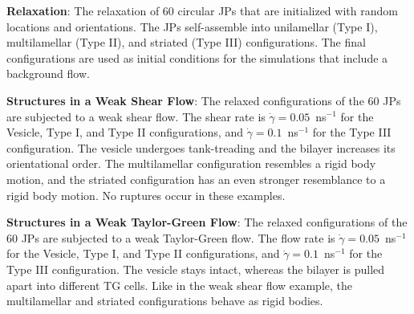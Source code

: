 \noindent
{\bf Relaxation}: The relaxation of 60 circular JPs that are initialized
with random locations and orientations. The JPs self-assemble into
unilamellar (Type I), multilamellar (Type II), and striated (Type III)
configurations. The final configurations are used as initial conditions
for the simulations that include a background flow. 



\noindent
{\bf Structures in a Weak Shear Flow}:
The relaxed configurations of the 60 JPs are subjected to a weak shear
flow. The shear rate is $\dot{\gamma} = 0.05$~ns$^{-1}$ for the Vesicle,
Type I, and Type II configurations, and $\dot{\gamma} = 0.1$~ns$^{-1}$
for the Type III configuration. The vesicle undergoes tank-treading and
the bilayer increases its orientational order. The multilamellar
configuration resembles a rigid body motion, and the striated
configuration has an even stronger resemblance to a rigid body motion.
No ruptures occur in these examples. 


\noindent
{\bf Structures in a Weak Taylor-Green Flow}:
The relaxed configurations of the 60 JPs are subjected to a weak
Taylor-Green flow. The flow rate is $\dot{\gamma} = 0.05$~ns$^{-1}$ for
the Vesicle, Type I, and Type II configurations, and $\dot{\gamma} =
0.1$~ns$^{-1}$ for the Type III configuration. The vesicle stays intact,
whereas the bilayer is pulled apart into different TG cells. Like in the
weak shear flow example, the multilamellar and striated configurations
behave as rigid bodies.

